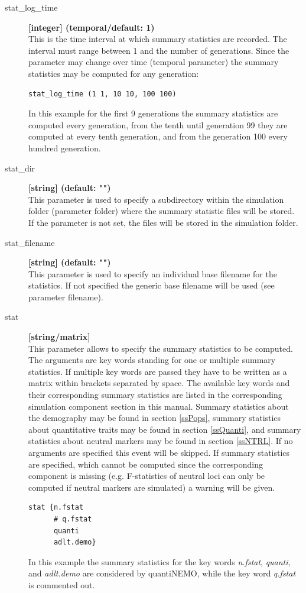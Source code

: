 \documentclass[letterpaper,12pt,oneside]{book}
\begin{document}
\begin{description}
\item[stat\_log\_time] \textbf{[integer] (temporal/default: 1)}\\
This is the time interval at which summary statistics are recorded. The interval must range between 1 and the number of generations. Since the parameter may change over time (temporal parameter) the summary statistics may be computed for any generation:
\begin{lstlisting}[frame=single]
stat_log_time (1 1, 10 10, 100 100) 
\end{lstlisting}
In this example for the first 9 generations the summary statistics are computed every generation, from the tenth until generation 99 they are computed at every tenth generation, and from the generation 100 every hundred generation. 

\item[stat\_dir] \textbf{[string] (default: "")}\\
This parameter is used to specify a subdirectory within the simulation folder (parameter \textsf{folder}) where the summary statistic files will be stored. If the parameter is not set, the files will be stored in the simulation folder.

\item[stat\_filename] \textbf{[string] (default: "")}\\
This parameter is used to specify an individual base filename for the statistics. If not specified the generic base filename will be used (see parameter \textsf{filename}).

\item[stat] \textbf{[string/matrix]}\\
This parameter allows to specify the summary statistics to be computed. The arguments are key words standing for one or multiple summary statistics. If multiple key words are passed they have to be written as a matrix within brackets separated by space. The available key words and their corresponding summary statistics are listed in the corresponding simulation component section in this manual. Summary statistics about the demography may be found in section \ref{ssPops}, summary statistics about quantitative traits may be found in section \ref{ssQuanti}, and summary statistics about neutral markers may be found in section \ref{ssNTRL}. If no arguments are specified this event will be skipped. If summary statistics are specified, which cannot be computed since the corresponding component is missing (e.g. F-statistics of neutral loci can only be computed if neutral markers are simulated) a warning will be given.   
\begin{lstlisting}[frame=single]
stat {n.fstat 
      # q.fstat 
      quanti 
      adlt.demo}
\end{lstlisting}
In this example the summary statistics for the key words \textit{n.fstat}, \textit{quanti}, and \textit{adlt.demo} are considered by quantiNEMO, while the key word \textit{q.fstat} is commented out.


\end{description}
\end{document}
